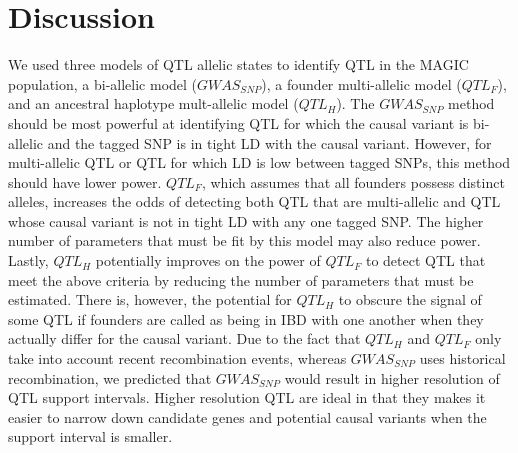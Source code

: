 \documentclass[article,9pt,twocolumn,twoside]{rilabRxiv}
\begin{document}


\section{Discussion}

We used three models of QTL allelic states to identify QTL in the MAGIC population, a bi-allelic model ($GWAS_{SNP}$), a founder multi-allelic model ($QTL_F$), and an ancestral haplotype mult-allelic model ($QTL_H$).
The $GWAS_{SNP}$ method should be most powerful at identifying QTL for which the causal variant is bi-allelic and the tagged SNP is in tight LD with the causal variant.
However, for multi-allelic QTL or QTL for which LD is low between tagged SNPs, this method should have lower power.
$QTL_F$, which assumes that all founders possess distinct alleles, increases the odds of detecting both QTL that are multi-allelic and QTL whose causal variant is not in tight LD with any one tagged SNP.
The higher number of parameters that must be fit by this model may also reduce power.
Lastly, $QTL_H$ potentially improves on the power of $QTL_F$ to detect QTL that meet the above criteria by reducing the number of parameters that must be estimated.
There is, however, the potential for $QTL_H$ to obscure the signal of some QTL if founders are called as being in IBD with one another when they actually differ for the causal variant.
Due to the fact that $QTL_H$ and $QTL_F$ only take into account recent recombination events, whereas $GWAS_{SNP}$ uses historical recombination, we predicted that $GWAS_{SNP}$ would result in higher resolution of QTL support intervals. Higher resolution QTL are ideal in that they makes it easier to narrow down candidate genes and potential causal variants when the support interval is smaller.
\end{document}
